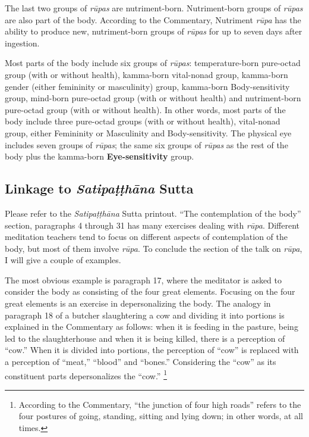 The last two groups of \textit{rūpas} are nutriment-born. Nutriment-born groups of \textit{rūpas} are also part of the body. According to the Commentary, Nutriment \textit{rūpa} has the ability to produce new, nutriment-born groups of \textit{rūpas} for up to seven days after ingestion.

Most parts of the body include six groups of \textit{rūpas}: temperature-born pure-octad group (with or without health), kamma-born vital-nonad group, kamma-born gender (either femininity or masculinity) group, kamma-born Body-sensitivity group, mind-born pure-octad group (with or without health) and nutriment-born pure-octad group (with or without health). In other words, most parts of the body include three pure-octad groups (with or without health), vital-nonad group, either Femininity or Masculinity and Body-sensitivity. The physical eye includes seven groups of \textit{rūpas}; the same six groups of \textit{rūpas} as the rest of the body plus the kamma-born \textbf{Eye-sensitivity} group.

\subsection*{Linkage to \textit{Satipaṭṭhāna} Sutta}

Please refer to the \textit{Satipaṭṭhāna} Sutta printout. “The contemplation of the body” section, paragraphs 4 through 31 has many exercises dealing with \textit{rūpa}. Different meditation teachers tend to focus on different aspects of contemplation of the body, but most of them involve \textit{rūpa}. To conclude the section of the talk on \textit{rūpa}, I will give a couple of examples.

The most obvious example is paragraph 17, where the meditator is asked to consider the body as consisting of the four great elements. Focusing on the four great elements is an exercise in depersonalizing the body. The analogy in paragraph 18 of a butcher slaughtering a cow and dividing it into portions is explained in the Commentary as follows: when it is feeding in the pasture, being led to the slaughterhouse and when it is being killed, there is a perception of “cow.” When it is divided into portions, the perception of “cow” is replaced with a perception of “meat,” “blood” and “bones.” Considering the “cow” as its constituent parts depersonalizes the “cow.” \footnote{According to the Commentary, “the junction of four high roads” refers to the four postures of going, standing, sitting and lying down; in other words, at all times.}


